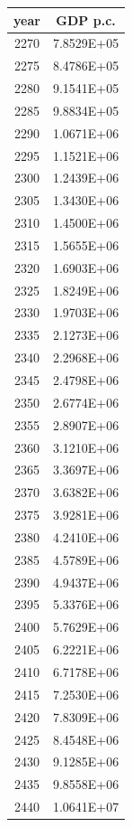\documentclass[a4paper]{article}
\begin{document}
	\begin{tabular}{|c|c|}
		\hline
		year & GDP p.c. \\
		\hline
		2270 & 7.8529E+05 \\
		\hline
		2275 & 8.4786E+05 \\
		\hline
		2280 & 9.1541E+05 \\
		\hline
		2285 & 9.8834E+05 \\
		\hline
		2290 & 1.0671E+06 \\
		\hline
		2295 & 1.1521E+06 \\
		\hline
		2300 & 1.2439E+06 \\
		\hline
		2305 & 1.3430E+06 \\
		\hline
		2310 & 1.4500E+06 \\
		\hline
		2315 & 1.5655E+06 \\
		\hline
		2320 & 1.6903E+06 \\
		\hline
		2325 & 1.8249E+06 \\
		\hline
		2330 & 1.9703E+06 \\
		\hline
		2335 & 2.1273E+06 \\
		\hline
		2340 & 2.2968E+06 \\
		\hline
		2345 & 2.4798E+06 \\
		\hline
		2350 & 2.6774E+06 \\
		\hline
		2355 & 2.8907E+06 \\
		\hline
		2360 & 3.1210E+06 \\
		\hline
		2365 & 3.3697E+06 \\
		\hline
		2370 & 3.6382E+06 \\
		\hline
		2375 & 3.9281E+06 \\
		\hline
		2380 & 4.2410E+06 \\
		\hline
		2385 & 4.5789E+06 \\
		\hline
		2390 & 4.9437E+06 \\
		\hline
		2395 & 5.3376E+06 \\
		\hline
		2400 & 5.7629E+06 \\
		\hline
		2405 & 6.2221E+06 \\
		\hline
		2410 & 6.7178E+06 \\
		\hline
		2415 & 7.2530E+06 \\
		\hline
		2420 & 7.8309E+06 \\
		\hline
		2425 & 8.4548E+06 \\
		\hline
		2430 & 9.1285E+06 \\
		\hline
		2435 & 9.8558E+06 \\
		\hline
		2440 & 1.0641E+07 \\

\end{tabular}
\end{document}
